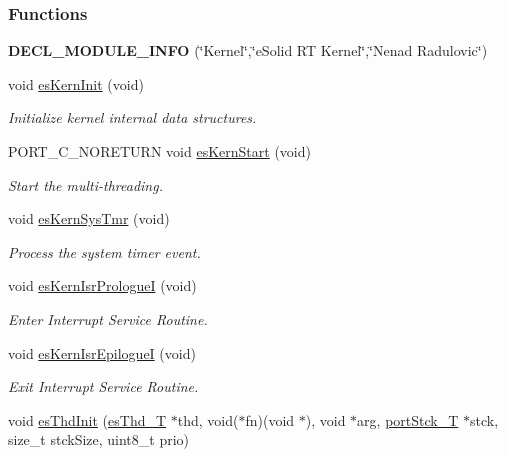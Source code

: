 \subsubsection*{Functions}
\begin{DoxyCompactItemize}
\item 
\hypertarget{group__kern__impl_gae9fe0e098459eaacd3282d7aa364f076}{{\bfseries D\-E\-C\-L\-\_\-\-M\-O\-D\-U\-L\-E\-\_\-\-I\-N\-F\-O} (\char`\"{}Kernel\char`\"{},\char`\"{}e\-Solid R\-T Kernel\char`\"{},\char`\"{}Nenad Radulovic\char`\"{})}\label{group__kern__impl_gae9fe0e098459eaacd3282d7aa364f076}

\item 
void \hyperlink{group__kern__impl_ga9e9ff699d62d6035cd51121bb3140704}{es\-Kern\-Init} (void)
\begin{DoxyCompactList}\small\item\em Initialize kernel internal data structures. \end{DoxyCompactList}\item 
P\-O\-R\-T\-\_\-\-C\-\_\-\-N\-O\-R\-E\-T\-U\-R\-N void \hyperlink{group__kern__impl_ga0e7a0a6b9c02df58de0f98de0229a09d}{es\-Kern\-Start} (void)
\begin{DoxyCompactList}\small\item\em Start the multi-\/threading. \end{DoxyCompactList}\item 
void \hyperlink{group__kern__impl_ga3182e4c1a47897109d0a429b10a2483e}{es\-Kern\-Sys\-Tmr} (void)
\begin{DoxyCompactList}\small\item\em Process the system timer event. \end{DoxyCompactList}\item 
void \hyperlink{group__kern__impl_ga194f9cbc5398fe0938504a378fcff810}{es\-Kern\-Isr\-Prologue\-I} (void)
\begin{DoxyCompactList}\small\item\em Enter Interrupt Service Routine. \end{DoxyCompactList}\item 
void \hyperlink{group__kern__impl_ga62d9b43eb8faf6c5df37e7b89811ac8d}{es\-Kern\-Isr\-Epilogue\-I} (void)
\begin{DoxyCompactList}\small\item\em Exit Interrupt Service Routine. \end{DoxyCompactList}\item 
void \hyperlink{group__kern__impl_gac91734f3ee867b519f59bf81cc7fde88}{es\-Thd\-Init} (\hyperlink{group__kern__intf_ga62e3a3ca0a4597a19c43cb8868810d82}{es\-Thd\-\_\-\-T} $\ast$thd, void($\ast$fn)(void $\ast$), void $\ast$arg, \hyperlink{group__template__cpu__intf_ga13cc91970e3e05fe4210440c068d3f4a}{port\-Stck\-\_\-\-T} $\ast$stck, size\-\_\-t stck\-Size, uint8\-\_\-t prio)

\end{DoxyCompactItemize}
